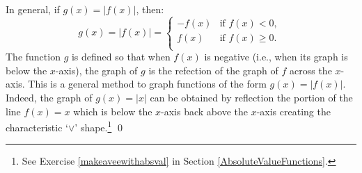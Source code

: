 \documentclass{ximera}
\begin{document}
\begin{example}
\begin{explanation}
     In general, if $g(x) = |f(x)|$, then: \[ g(x) = |f(x)| = \begin{cases} 
      -f(x) &  \text{if $f(x)  < 0$, } \\
     f(x)  & \text{if $f(x)  \geq 0$.} \\
   \end{cases}  \]  The function $g$ is defined so that when $f(x)$ is negative (i.e., when its graph is below the $x$-axis), the graph of $g$ is the refection of the graph of $f$ across the $x$-axis.   This is a general method  to graph functions of the form $g(x) = |f(x)|$.  Indeed, the graph of $g(x) = |x|$ can be obtained by reflection the portion of the line $f(x) =x$ which is below the $x$-axis back above the $x$-axis creating the characteristic `$\vee$' shape.\footnote{See Exercise \ref{makeaveewithabsval} in Section \ref{AbsoluteValueFunctions}.}  \qed
\end{explanation}
\end{example}



\closegraphsfile
\end{document}
